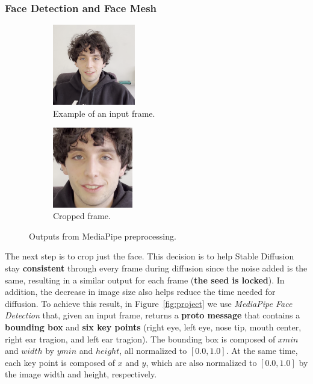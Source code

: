 \documentclass[preprint]{elsarticle}
\begin{document}
\subsubsection{Face Detection and Face Mesh}\label{sec:face_detection}




\begin{figure}[t]
	\centering
	\begin{subfigure}[b]{0.5\textwidth}
		\centering
		\includegraphics[width=3.6cm, keepaspectratio]{img/project_img/init.png}
		\caption{Example of an input frame.}\label{fig:init-frame}
	\end{subfigure}%
	\hfill
	\begin{subfigure}[b]{0.5\textwidth}
		\centering
		\includegraphics[width=3.5cm, keepaspectratio]{img/project_img/cropped.png}
		\caption{Cropped frame.}\label{fig:cropped}
	\end{subfigure}%
	\caption{Outputs from MediaPipe preprocessing.}\label{fig:project-mediapipe}
\end{figure}



The next step is to crop just the face.  This decision is to help Stable Diffusion stay \textbf{consistent} through every frame during diffusion since the noise added is the same,  resulting in a similar output for each frame (\textbf{the seed is locked}).  In addition, the decrease in image size also helps reduce the time needed for diffusion. 
To achieve this result, in Figure~\ref{fig:project} we use \emph{MediaPipe Face Detection} that, given an input frame,  returns a \textbf{proto message} that contains a \textbf{bounding box} and \textbf{six key points} (right eye, left eye, nose tip, mouth center, right ear tragion, and left ear tragion). 
The bounding box is composed of $xmin$ and $width$ by $ymin$ and $height$, all normalized to $[0.0, 1.0]$. 
At the same time, each key point is composed of $x$ and $y$, which are also normalized to $[0.0, 1.0]$ by the image width and height, respectively. 
\end{document}

